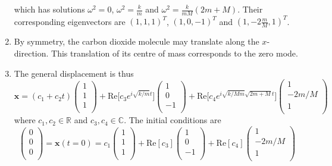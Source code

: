 \documentclass[a4paper]{article}
\begin{document}
\begin{ans}
\begin{enumerate}[label=(\roman*)]
which has solutions $\omega^2=0$, $\omega^2=\frac{k}{m}$ and $\omega^2=\frac{k}{mM}(2m+M)$. Their corresponding eigenvectors are $(1,1,1)^T$, $(1,0,-1)^T$ and $(1,-2\frac{m}{M},1)^T$.
\item By symmetry, the carbon dioxide molecule may translate along the $x$-direction. This translation of its centre of mass corresponds to the zero mode.
\item The general displacement is thus 
$$\mathbf{x}=(c_1+c_2t)\begin{pmatrix}1\\1\\1\\\end{pmatrix}+\text{Re}\bigg[c_3e^{i\sqrt{k/m}t}\bigg]\begin{pmatrix}1\\0\\-1\\\end{pmatrix}+\text{Re}\bigg[c_4e^{i\sqrt{k/Mm}\sqrt{2m+M}t}\bigg]\begin{pmatrix}1\\-2m/M\\1\\\end{pmatrix}$$
where $c_1,c_2\in\mathbb{R}$ and $c_3,c_4\in\mathbb{C}$. The initial conditions are
$$\begin{pmatrix}0\\0\\0\\\end{pmatrix}=\mathbf{x}(t=0)=c_1\begin{pmatrix}1\\1\\1\\\end{pmatrix}+\text{Re}[c_3]\begin{pmatrix}1\\0\\-1\\\end{pmatrix}+\text{Re}[c_4]\begin{pmatrix}1\\-2m/M\\1\\\end{pmatrix}$$

\end{enumerate}
\end{ans}
\end{document}
